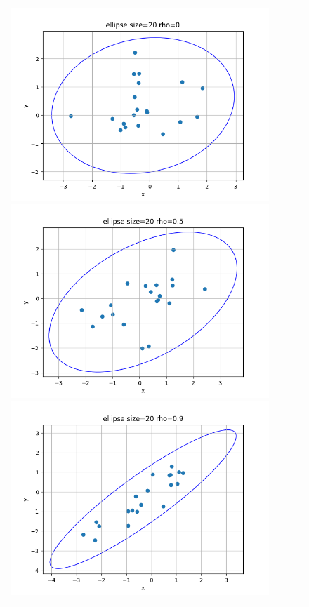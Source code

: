 \begin{figure}[H]
	\begin{tabular}{cccc}
		\includegraphics[scale=0.3]{ellipse_20_0.png}
		\includegraphics[scale=0.3]{ellipse_20_0.5.png}
		\includegraphics[scale=0.3]{ellipse_20_0.9.png}

\end{tabular}
\end{figure}
